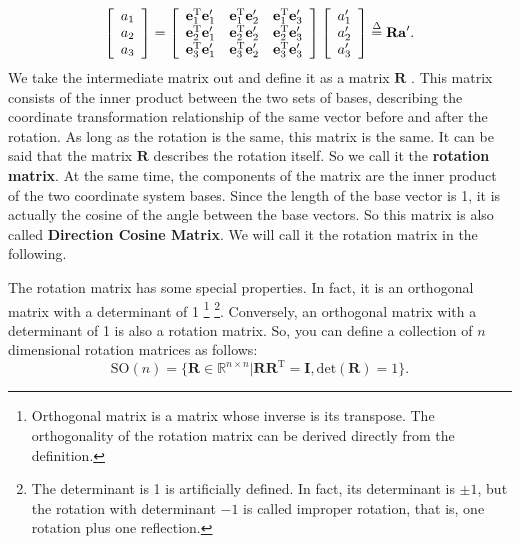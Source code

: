 \begin{equation}
\left[ \begin{array}{l}
{a_1}\\
{a_2}\\
{a_3}
\end{array}\right]=\left[{\begin{array}{*{20}{c}}    
    {\mathbf{e}_1^\mathrm{T}\mathbf{e}_1'} & {\mathbf{e}_1^\mathrm{T}\mathbf{e}_2'} & {\mathbf{e}_1^\mathrm{T}\mathbf{e}_3'}\\
    {\mathbf{e}_2^\mathrm{T}\mathbf{e}_1'} & {\mathbf{e}_2^\mathrm{T}\mathbf{e}_2'} & {\mathbf{e}_2^\mathrm{T}\mathbf{e}_3'}\\
    {\mathbf{e}_3^\mathrm{T}\mathbf{e}_1'} & {\mathbf{e}_3^\mathrm{T}\mathbf{e}_2'} & {\mathbf{e}_3^\mathrm{T}\mathbf{e}_3'}
    \end{array}} \right]\left[ \begin{array}{l}
a_1'\\
a_2'\\
a_3'
\end{array} \right] \buildrel \Delta \over = \mathbf{R} \mathbf{a}'.
\end{equation}
We take the intermediate matrix out and define it as a matrix $ \mathbf{R} $ . This matrix consists of the inner product between the two sets of bases, describing the coordinate transformation relationship of the same vector before and after the rotation. As long as the rotation is the same, this matrix is the same. It can be said that the matrix $ \mathbf{R} $ describes the rotation itself. So we call it the \textbf{rotation matrix}. At the same time, the components of the matrix are the inner product of the two coordinate system bases. Since the length of the base vector is 1, it is actually the cosine of the angle between the base vectors. So this matrix is also called \textbf{Direction Cosine Matrix}. We will call it the rotation matrix in the following.

The rotation matrix has some special properties. In fact, it is an orthogonal matrix with a determinant of 1 \footnote{Orthogonal matrix is a matrix whose inverse is its transpose. The orthogonality of the rotation matrix can be derived directly from the definition. } \footnote{The determinant is 1 is artificially defined. In fact, its determinant is $\pm 1 $, but the rotation with determinant $ - 1 $ is called improper rotation, that is, one rotation plus one reflection. }. Conversely, an orthogonal matrix with a determinant of 1 is also a rotation matrix. So, you can define a collection of $n$ dimensional rotation matrices as follows:
\begin{equation}
\mathrm{SO}(n) = \{ \mathbf{R} \in \mathbb{R}^{n \times n} | \mathbf{R R}^\mathrm{T} = \mathbf{I}, \mathrm{det} (\mathbf{R})=1 \}.
\end{equation}

